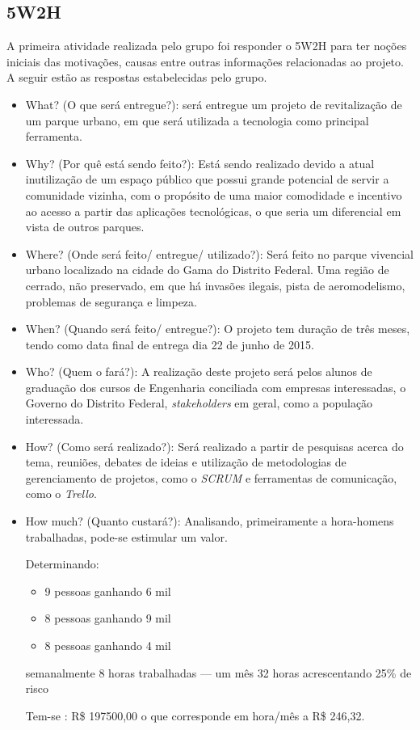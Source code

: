\subsection{5W2H}

A primeira atividade realizada pelo grupo foi responder o 5W2H para ter no\c{c}\~oes iniciais das motiva\c{c}\~oes, causas entre outras informa\c{c}\~oes relacionadas ao projeto. A seguir est\~ao as respostas estabelecidas pelo grupo.

\begin{itemize}
	\item What? (O que ser\'a entregue?): ser\'a entregue um projeto de revitaliza\c{c}\~ao de um parque urbano, em que ser\'a utilizada a tecnologia como principal ferramenta.
	\item Why? (Por qu\^e est\'a sendo feito?): Est\'a sendo realizado devido a atual inutiliza\c{c}\~ao de um espa\c{c}o p\'ublico que possui grande potencial de servir a comunidade vizinha, com o prop\'osito de uma maior comodidade e incentivo ao acesso a partir das aplica\c{c}\~oes tecnol\'ogicas, o que seria um diferencial em vista de outros parques.
	\item Where? (Onde ser\'a feito/ entregue/ utilizado?): Ser\'a feito no parque vivencial urbano localizado na cidade do Gama do Distrito Federal. Uma regi\~ao de cerrado, n\~ao preservado, em que h\'a invas\~oes ilegais, pista de aeromodelismo, problemas de seguran\c{c}a e limpeza.
	\item When? (Quando ser\'a feito/ entregue?): O projeto tem dura\c{c}\~ao de tr\^es meses, tendo como data final de entrega dia 22 de junho de 2015.
	\item Who? (Quem o far\'a?): A realiza\c{c}\~ao deste projeto ser\'a pelos alunos de gradua\c{c}\~ao dos cursos de Engenharia conciliada com empresas interessadas, o Governo do Distrito Federal, \textit{stakeholders} em geral, como a popula\c{c}\~ao interessada.
	\item How? (Como ser\'a realizado?): Ser\'a realizado a partir de pesquisas acerca do tema, reuni\~oes, debates de ideias e utiliza\c{c}\~ao de metodologias de gerenciamento de projetos, como o \textit{SCRUM} e ferramentas de comunica\c{c}\~ao, como o \textit{Trello}.
	\item How much? (Quanto custar\'a?): Analisando, primeiramente a hora-homens trabalhadas, pode-se estimular um valor.

Determinando: 
\begin{itemize}
        \item 9 pessoas ganhando 6 mil
	\item 8 pessoas ganhando 9 mil
	\item 8 pessoas ganhando 4 mil
\end{itemize}

semanalmente 8 horas trabalhadas --- um m\^es 32 horas
acrescentando 25\% de risco

Tem-se : R\$ 197500,00 o que corresponde em hora/m\^es a R\$ 246,32.
\end{itemize}

